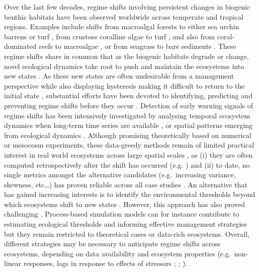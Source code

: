 \begin{refsection}
Over the last few decades, regime shifts involving persistent changes in
biogenic benthic habitats have been observed worldwide across temperate
and tropical regions. Examples include shifts from macroalgal forests to
either sea urchin barrens \autocite{Ling_2015} or turf
\autocite{Filbee-Dexter_2018}, from crustose coralline algae to turf
\autocite{Cornwall_2023}, and also from coral-dominated reefs to
macroalgae \autocite{McManus_2004}, or from seagrass to bare sediments
\autocite{Maxwell_2017}. These regime shifts share in common that as the
biogenic habitats degrade or change, novel ecological dynamics take root
to push and maintain the ecosystems into new states
\autocite{Nystrom_2012}. As these new states are often undesirable from
a management perspective while also displaying hysteresis making it
difficult to return to the initial state \autocite{Nystrom_2012},
substantial efforts have been devoted to identifying, predicting and
preventing regime shifts before they occur \autocite{Biggs_2009}.
Detection of early warning signals of regime shifts has been intensively
investigated by analysing temporal ecosystem dynamics when long-term
time series are available \autocite{Scheffer_2009}, or spatial patterns
emerging from ecological dynamics \autocites[ ]{Kefi_2014}[
]{Nijp_2019}{Ward_2018}. Although promising theoretically based on
numerical or mesocosm experiments, these data-greedy methods remain of
limited practical interest in real world ecosystems across large spatial
scales , as (i) they are often computed retrospectively after the shift
has occurred (e.g. \textcite{Litzow_2014}) and (ii) to date, no single
metrics amongst the alternative candidates (e.g.~increasing variance,
skewness, etc\ldots) has proven reliable across all case studies
\autocite{Hastings_2010}. An alternative that has gained increasing
interests is to identify the environmental thresholds beyond which
ecosystems shift to new states \autocite{Kelly_2015}. However, this
approach has also proved challenging \autocites[
]{Turner_2020}{Hillebrand_2020}. Process-based simulation models can for
instance contribute to estimating ecological thresholds and informing
effective management strategies \autocites[
]{Marzloff_2013}{Marzloff_2016} but they remain restricted to
theoretical cases or data-rich ecosystems. Overall, different strategies
may be necessary to anticipate regime shifts across ecosystems,
depending on data availability and ecosystem properties (e.g.~non-linear
responses, lags in response to effects of stressors ;
\textcite{Litzow_2016} ; \textcite{Turner_2020}).


\end{refsection}
